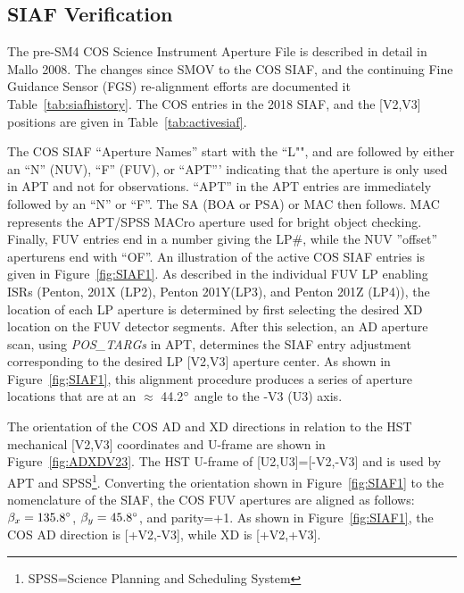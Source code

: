 \subsection{SIAF Verification} \label{sec:siaf}\label{subsec:siafextra}
The pre-SM4 COS Science Instrument Aperture File is described in detail in Mallo 2008. The changes
since SMOV to the COS SIAF, and the continuing Fine Guidance Sensor (FGS) re-alignment efforts are
documented it Table~\ref{tab:siafhistory}. The COS entries in the 2018 SIAF, and the [V2,V3] positions are given in Table~\ref{tab:activesiaf}.

The COS SIAF ``Aperture Names''  start with the ``L"", and are followed by either an ``N'' (NUV), ``F'' (FUV), or
``APT''' indicating that the aperture is only used in APT and not for observations.
``APT'' in the APT entries are immediately followed by an ``N'' or ``F''.
The SA (BOA or PSA) or MAC then follows. MAC represents the APT/SPSS MACro aperture used for bright object checking.
Finally, FUV entries end in a number giving the LP\#, while the NUV ''offset'' aperturens end with ``OF''.
An illustration of the active COS SIAF entries is given in Figure~\ref{fig:SIAF1}. As described in the individual
FUV LP enabling ISRs (Penton, 201X (LP2), Penton 201Y(LP3), and Penton 201Z (LP4)), the location of each LP aperture
is determined by first selecting the desired XD location on the FUV detector segments. After this selection,
an AD aperture scan, using \textit{POS\_TARGs} in APT, determines the SIAF entry adjustment corresponding to
the desired LP [V2,V3] aperture center. As shown in Figure~\ref{fig;SIAF1}, this alignment procedure produces
a series of aperture locations that are at an $\approx$ 44.2$\hbox{$^{\circ}$}$ angle to the -V3 (U3) axis.

The orientation of the COS AD and XD directions in relation to the HST mechanical [V2,V3] coordinates
and U-frame are shown in Figure~\ref{fig:ADXDV23}. The HST U-frame of [U2,U3]=[-V2,-V3] and is used by APT
and SPSS\footnote{SPSS=Science Planning and Scheduling System}.  Converting the orientation shown in Figure~\ref{fig:SIAF1} to
the nomenclature of the SIAF, the COS FUV apertures are aligned as follows:
$\beta_{x}=135.8\hbox{$^{\circ}$}$, $\beta_y=45.8\hbox{$^{\circ}$}$, and parity=+1. As shown in Figure~\ref{fig:SIAF1}, the COS AD direction is [+V2,-V3],
while XD is [+V2,+V3].

